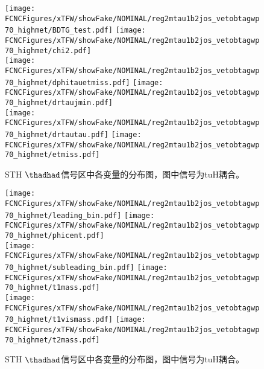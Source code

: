 \begin{figure}[H]
\centering
\texttt{[image: \\FCNCFigures/xTFW/showFake/NOMINAL/reg2mtau1b2jos\_vetobtagwp70\_highmet/BDTG\_test.pdf]}
\texttt{[image: \\FCNCFigures/xTFW/showFake/NOMINAL/reg2mtau1b2jos\_vetobtagwp70\_highmet/chi2.pdf]}
\\
\texttt{[image: \\FCNCFigures/xTFW/showFake/NOMINAL/reg2mtau1b2jos\_vetobtagwp70\_highmet/dphitauetmiss.pdf]}
\texttt{[image: \\FCNCFigures/xTFW/showFake/NOMINAL/reg2mtau1b2jos\_vetobtagwp70\_highmet/drtaujmin.pdf]}
\\
\texttt{[image: \\FCNCFigures/xTFW/showFake/NOMINAL/reg2mtau1b2jos\_vetobtagwp70\_highmet/drtautau.pdf]}
\texttt{[image: \\FCNCFigures/xTFW/showFake/NOMINAL/reg2mtau1b2jos\_vetobtagwp70\_highmet/etmiss.pdf]}
\\
\caption{STH $\thadhad$信号区中各变量的分布图，图中信号为tuH耦合。}
\label{fig:var_reg2mtau1b2jos_vetobtagwp70_highmet_0}
\end{figure}
\begin{figure}[H]
\centering
\texttt{[image: \\FCNCFigures/xTFW/showFake/NOMINAL/reg2mtau1b2jos\_vetobtagwp70\_highmet/leading\_bin.pdf]}
\texttt{[image: \\FCNCFigures/xTFW/showFake/NOMINAL/reg2mtau1b2jos\_vetobtagwp70\_highmet/phicent.pdf]}
\\
\texttt{[image: \\FCNCFigures/xTFW/showFake/NOMINAL/reg2mtau1b2jos\_vetobtagwp70\_highmet/subleading\_bin.pdf]}
\texttt{[image: \\FCNCFigures/xTFW/showFake/NOMINAL/reg2mtau1b2jos\_vetobtagwp70\_highmet/t1mass.pdf]}
\\
\texttt{[image: \\FCNCFigures/xTFW/showFake/NOMINAL/reg2mtau1b2jos\_vetobtagwp70\_highmet/t1vismass.pdf]}
\texttt{[image: \\FCNCFigures/xTFW/showFake/NOMINAL/reg2mtau1b2jos\_vetobtagwp70\_highmet/t2mass.pdf]}
\\
\caption{STH $\thadhad$信号区中各变量的分布图，图中信号为tuH耦合。}
\label{fig:var_reg2mtau1b2jos_vetobtagwp70_highmet_1}
\end{figure}
